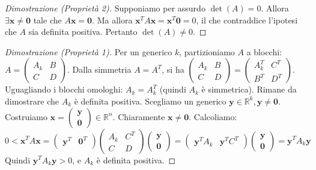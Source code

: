 \begin{proof}[Dimostrazione (Proprietà 2)]
Supponiamo per assurdo $\det(A)=0$. Allora $\exists \mathbf{x} \neq \mathbf{0}$ tale che $A\mathbf{x} = \mathbf{0}$. Ma allora $\mathbf{x}^T A \mathbf{x} = \mathbf{x}^T \mathbf{0} = 0$, il che contraddice l'ipotesi che $A$ sia definita positiva. Pertanto $\det(A) \neq 0$.
\end{proof}

\begin{proof}[Dimostrazione (Proprietà 1)]
Per un generico $k$, partizioniamo $A$ a blocchi: $A = \begin{pmatrix} A_k & B \\ C & D \end{pmatrix}$.
Dalla simmetria $A=A^T$, si ha $\begin{pmatrix} A_k & B \\ C & D \end{pmatrix} = \begin{pmatrix} A_k^T & C^T \\ B^T & D^T \end{pmatrix}$. Uguagliando i blocchi omologhi: $A_k = A_k^T$ (quindi $A_k$ è simmetrica).
Rimane da dimostrare che $A_k$ è definita positiva. Scegliamo un generico $\mathbf{y} \in \mathbb{R}^k, \mathbf{y} \neq \mathbf{0}$. Costruiamo $\mathbf{x} = \begin{pmatrix} \mathbf{y} \\ \mathbf{0} \end{pmatrix} \in \mathbb{R}^n$. Chiaramente $\mathbf{x} \neq \mathbf{0}$.
Calcoliamo:
$$ 0 < \mathbf{x}^T A \mathbf{x} = \begin{pmatrix} \mathbf{y}^T & \mathbf{0}^T \end{pmatrix} \begin{pmatrix} A_k & C^T \\ C & D \end{pmatrix} \begin{pmatrix} \mathbf{y} \\ \mathbf{0} \end{pmatrix} = \begin{pmatrix} \mathbf{y}^T A_k & \mathbf{y}^T C^T \end{pmatrix} \begin{pmatrix} \mathbf{y} \\ \mathbf{0} \end{pmatrix} = \mathbf{y}^T A_k \mathbf{y} $$
Quindi $\mathbf{y}^T A_k \mathbf{y} > 0$, e $A_k$ è definita positiva.
\end{proof}

